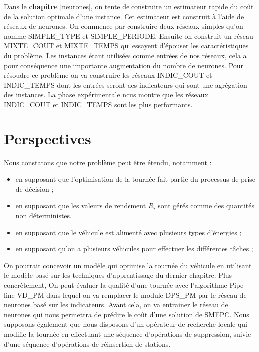 	Dans le \textbf{chapitre} \ref{neurones}, on tente de construire un estimateur rapide du coût de la solution optimale d'une instance. Cet estimateur est construit à l'aide de réseaux de neurones. On commence par construire deux réseaux \og simples\fg{} qu'on nomme SIMPLE\_TYPE et SIMPLE\_PERIODE. Ensuite on construit un réseau MIXTE\_COUT et MIXTE\_TEMPS qui essayent d'épouser les caractéristiques du problème. %
	 Les instances étant utilisées comme entrées de nos réseaux, cela a pour conséquence une importante augmentation du nombre de neurones. Pour résoudre ce problème on va construire les réseaux INDIC\_COUT et INDIC\_TEMPS dont les entrées seront des indicateurs qui sont une agrégation des instances. La phase expérimentale nous montre que les réseaux INDIC\_COUT et INDIC\_TEMPS sont les plus performants.
	
	
	
\section{Perspectives}
	Nous constatons que notre problème peut être étendu, notamment :
	\begin{itemize}[label=$\square$]
			\item en supposant que l'optimisation de la tournée fait partie du processus de prise de décision ;
		\item en supposant que les valeurs de rendement $R_i$ sont gérés comme des quantités non déterministes.
	\item en supposant que le véhicule est alimenté avec plusieurs types d'énergies ;
	\item en supposant qu'on a plusieurs véhicules pour effectuer les différentes tâches ;
 
	\end{itemize}
	
	
	\label{extensions_SMEPC}
	On pourrait concevoir un modèle qui optimise la tournée du véhicule en utilisant le modèle basé sur les techniques d'apprentissage du dernier chapitre. Plus concrètement, On peut évaluer la qualité d'une tournée avec l'algorithme Pipe-line VD\_PM dans lequel on va remplacer le module DPS\_PM par le réseau de neurones basé sur les indicateurs. Avant cela, on va entrainer le réseau de neurones qui nous permettra de prédire le coût d'une solution de SMEPC. Nous supposons également que nous disposons d'un opérateur de recherche locale qui modifie la tournée en effectuant une séquence d'opérations de suppression, suivie d'une séquence d'opérations de réinsertion de stations.
	
